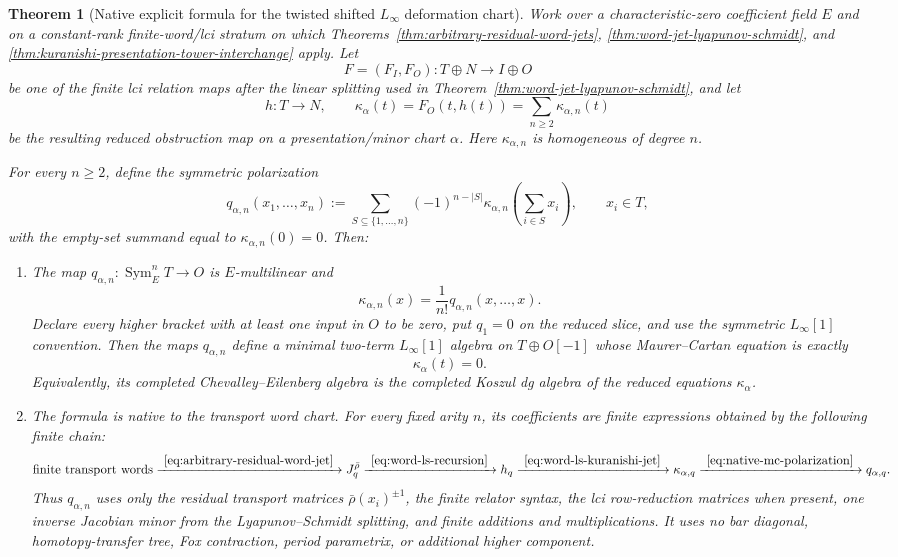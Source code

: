 \documentclass[11pt]{article}
\newtheorem{theorem}{Theorem}[section]
\theoremstyle{definition}
\begin{document}
\begin{theorem}[Native explicit formula for the twisted shifted $L_\infty$ deformation chart]\label{thm:native-twisted-linfinity}
Work over a characteristic-zero coefficient field $E$ and on a constant-rank
finite-word/lci stratum on which
Theorems~\ref{thm:arbitrary-residual-word-jets},
\ref{thm:word-jet-lyapunov-schmidt}, and
\ref{thm:kuranishi-presentation-tower-interchange} apply.  Let
\[
 F=(F_I,F_O):T\oplus N\longrightarrow I\oplus O
\]
be one of the finite lci relation maps after the linear splitting used in
Theorem~\ref{thm:word-jet-lyapunov-schmidt}, and let
\[
 h:T\longrightarrow N,
 \qquad
 \kappa_\alpha(t)=F_O(t,h(t))
 =\sum_{n\ge2}\kappa_{\alpha,n}(t)
\]
be the resulting reduced obstruction map on a presentation/minor chart
$\alpha$.  Here $\kappa_{\alpha,n}$ is homogeneous of degree $n$.

For every $n\ge2$, define the symmetric polarization
\begin{equation}\label{eq:native-mc-polarization}
 q_{\alpha,n}(x_1,\ldots,x_n)
 :=
 \sum_{S\subseteq\{1,\ldots,n\}}
 (-1)^{n-|S|}
 \kappa_{\alpha,n}\!\left(\sum_{i\in S}x_i\right),
 \qquad x_i\in T,
\end{equation}
with the empty-set summand equal to $\kappa_{\alpha,n}(0)=0$.  Then:
\begin{enumerate}[label=\textnormal{(\roman*)}]
\item The map $q_{\alpha,n}:\operatorname{Sym}^n_E T\to O$ is $E$-multilinear and
\begin{equation}\label{eq:native-mc-diagonal}
 \kappa_{\alpha,n}(x)
 =\frac1{n!}q_{\alpha,n}(x,\ldots,x).
\end{equation}
Declare every higher bracket with at least one input in $O$ to be zero, put
$q_1=0$ on the reduced slice, and use the symmetric $L_\infty[1]$ convention.
Then the maps $q_{\alpha,n}$ define a minimal two-term $L_\infty[1]$ algebra
on $T\oplus O[-1]$ whose Maurer--Cartan equation is exactly
\[
 \kappa_\alpha(t)=0.
\]
Equivalently, its completed Chevalley--Eilenberg algebra is the completed
Koszul dg algebra of the reduced equations $\kappa_\alpha$.

\item The formula is native to the transport word chart.  For every fixed
arity $n$, its coefficients are finite expressions obtained by the following
finite chain:
\begin{equation}\label{eq:native-mc-explicit-chain}
 \text{finite transport words}
 \xrightarrow{\ \eqref{eq:arbitrary-residual-word-jet}\ }
 J_q^{\bar\rho}
 \xrightarrow{\ \eqref{eq:word-ls-recursion}\ }
 h_q
 \xrightarrow{\ \eqref{eq:word-ls-kuranishi-jet}\ }
 \kappa_{\alpha,q}
 \xrightarrow{\ \eqref{eq:native-mc-polarization}\ }
 q_{\alpha,q}.
\end{equation}
Thus $q_{\alpha,n}$ uses only the residual transport matrices
$\bar\rho(x_i)^{\pm1}$, the finite relator syntax, the lci row-reduction
matrices when present, one inverse Jacobian minor from the
Lyapunov--Schmidt splitting, and finite additions and multiplications.  It
uses no bar diagonal, homotopy-transfer tree, Fox contraction, period
parametrix, or additional higher component.


\end{enumerate}
\end{theorem}
\end{document}
